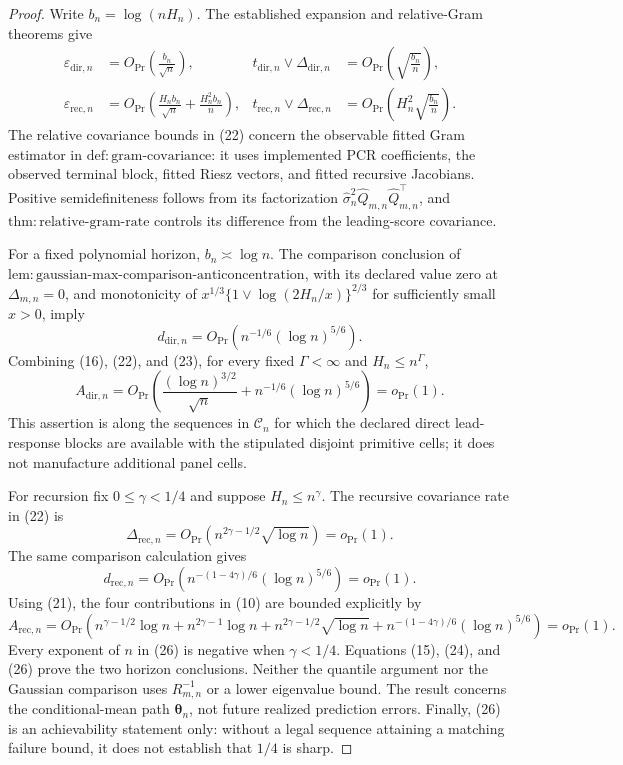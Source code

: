 \documentclass{article}
\begin{document}
\begin{proof}
Write \(b_n=\log(nH_n)\).  The established expansion and relative-Gram theorems give
\[
\begin{aligned}
 \varepsilon_{\mathrm{dir},n}
 &=O_{\Pr}\!\left(\frac{b_n}{\sqrt n}\right),
 &t_{\mathrm{dir},n}\vee\Delta_{\mathrm{dir},n}
 &=O_{\Pr}\!\left(\sqrt{\frac{b_n}{n}}\right),\\
 \varepsilon_{\mathrm{rec},n}
 &=O_{\Pr}\!\left(\frac{H_nb_n}{\sqrt n}
       +\frac{H_n^2b_n}{n}\right),
 &t_{\mathrm{rec},n}\vee\Delta_{\mathrm{rec},n}
 &=O_{\Pr}\!\left(H_n^2\sqrt{\frac{b_n}{n}}\right).              \tag{22}
\end{aligned}
\]
The relative covariance bounds in (22) concern the observable fitted Gram estimator in \(\mathrm{def{:}gram\mbox{-}covariance}\): it uses implemented PCR coefficients, the observed terminal block, fitted Riesz vectors, and fitted recursive Jacobians.  Positive semidefiniteness follows from its factorization \(\widehat\sigma_n^2\widehat Q_{m,n}\widehat Q_{m,n}^{\top}\), and \(\mathrm{thm{:}relative\mbox{-}gram\mbox{-}rate}\) controls its difference from the leading-score covariance.

For a fixed polynomial horizon, \(b_n\asymp\log n\).  The comparison conclusion of \(\mathrm{lem{:}gaussian\mbox{-}max\mbox{-}comparison\mbox{-}anticoncentration}\), with its declared value zero at \(\Delta_{m,n}=0\), and monotonicity of \(x^{1/3}\{1\vee\log(2H_n/x)\}^{2/3}\) for sufficiently small \(x>0\), imply
\[
 d_{\mathrm{dir},n}
 =O_{\Pr}\!\left(n^{-1/6}(\log n)^{5/6}\right).                   \tag{23}
\]
Combining (16), (22), and (23), for every fixed \(\Gamma<\infty\) and \(H_n\le n^\Gamma\),
\[
 A_{\mathrm{dir},n}
 =O_{\Pr}\!\left(
 \frac{(\log n)^{3/2}}{\sqrt n}
 +n^{-1/6}(\log n)^{5/6}\right)=o_{\Pr}(1).                       \tag{24}
\]
This assertion is along the sequences in \(\mathcal C_n\) for which the declared direct lead-response blocks are available with the stipulated disjoint primitive cells; it does not manufacture additional panel cells.

For recursion fix \(0\le\gamma<1/4\) and suppose \(H_n\le n^\gamma\).  The recursive covariance rate in (22) is
\[
 \Delta_{\mathrm{rec},n}
 =O_{\Pr}\!\left(n^{2\gamma-1/2}\sqrt{\log n}\right)=o_{\Pr}(1).
\]
The same comparison calculation gives
\[
 d_{\mathrm{rec},n}
 =O_{\Pr}\!\left(
 n^{-(1-4\gamma)/6}(\log n)^{5/6}\right)=o_{\Pr}(1).              \tag{25}
\]
Using (21), the four contributions in (10) are bounded explicitly by
\[
 A_{\mathrm{rec},n}
 =O_{\Pr}\!\left(
 n^{\gamma-1/2}\log n
 +n^{2\gamma-1}\log n
 +n^{2\gamma-1/2}\sqrt{\log n}
 +n^{-(1-4\gamma)/6}(\log n)^{5/6}
 \right)=o_{\Pr}(1).                                                \tag{26}
\]
Every exponent of \(n\) in (26) is negative when \(\gamma<1/4\).  Equations (15), (24), and (26) prove the two horizon conclusions.  Neither the quantile argument nor the Gaussian comparison uses \(R_{m,n}^{-1}\) or a lower eigenvalue bound.  The result concerns the conditional-mean path \(\boldsymbol\theta_n\), not future realized prediction errors.  Finally, (26) is an achievability statement only: without a legal sequence attaining a matching failure bound, it does not establish that \(1/4\) is sharp.
\end{proof}
\end{document}
